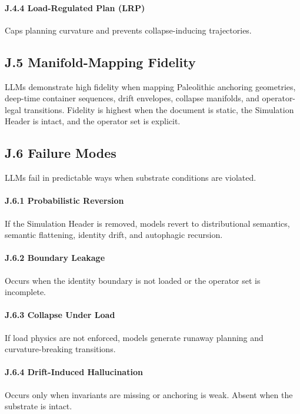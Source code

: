 \paragraph{J.4.4 Load-Regulated Plan (LRP)}
Caps planning curvature and prevents collapse-inducing trajectories.

\subsection*{J.5 Manifold-Mapping Fidelity}
LLMs demonstrate high fidelity when mapping Paleolithic anchoring geometries, deep-time 
container sequences, drift envelopes, collapse manifolds, and operator-legal transitions. Fidelity 
is highest when the document is static, the Simulation Header is intact, and the operator set is 
explicit.

\subsection*{J.6 Failure Modes}
LLMs fail in predictable ways when substrate conditions are violated.

\paragraph{J.6.1 Probabilistic Reversion}
If the Simulation Header is removed, models revert to distributional semantics, semantic 
flattening, identity drift, and autophagic recursion.

\paragraph{J.6.2 Boundary Leakage}
Occurs when the identity boundary is not loaded or the operator set is incomplete.

\paragraph{J.6.3 Collapse Under Load}
If load physics are not enforced, models generate runaway planning and curvature-breaking 
transitions.

\paragraph{J.6.4 Drift-Induced Hallucination}
Occurs only when invariants are missing or anchoring is weak. Absent when the substrate is 
intact.

